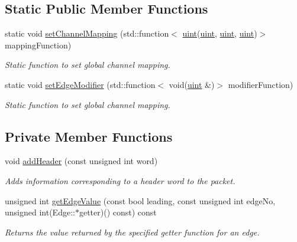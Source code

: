 \subsection*{Static Public Member Functions}
\begin{DoxyCompactItemize}
\item 
static void \hyperlink{class_packet_aab292dda74224f53a94d005f49a1c3a8}{set\+Channel\+Mapping} (std\+::function$<$ \hyperlink{_channel_mappings_8cpp_a69aa29b598b851b0640aa225a9e5d61d}{uint}(\hyperlink{_channel_mappings_8cpp_a69aa29b598b851b0640aa225a9e5d61d}{uint}, \hyperlink{_channel_mappings_8cpp_a69aa29b598b851b0640aa225a9e5d61d}{uint}, \hyperlink{_channel_mappings_8cpp_a69aa29b598b851b0640aa225a9e5d61d}{uint})$>$ mapping\+Function)
\begin{DoxyCompactList}\small\item\em Static function to set global channel mapping. \end{DoxyCompactList}\item 
static void \hyperlink{class_packet_a2316cd4582e675d52de8c302c192d46f}{set\+Edge\+Modifier} (std\+::function$<$ void(\hyperlink{_channel_mappings_8cpp_a69aa29b598b851b0640aa225a9e5d61d}{uint} \&)$>$ modifier\+Function)
\begin{DoxyCompactList}\small\item\em Static function to set global channel mapping. \end{DoxyCompactList}\end{DoxyCompactItemize}
\subsection*{Private Member Functions}
\begin{DoxyCompactItemize}
\item 
void \hyperlink{class_packet_a7f710ea08bf8d264beb1361f19cc3afb}{add\+Header} (const unsigned int word)
\begin{DoxyCompactList}\small\item\em Adds information corresponding to a header word to the packet. \end{DoxyCompactList}\item 
unsigned int \hyperlink{class_packet_af3abe7485b62e417e83b11c8891ba7a6}{get\+Edge\+Value} (const bool leading, const unsigned int edge\+No, unsigned int(Edge\+::$\ast$getter)() const) const
\begin{DoxyCompactList}\small\item\em Returns the value returned by the specified getter function for an edge. \end{DoxyCompactList}\end{DoxyCompactItemize}

